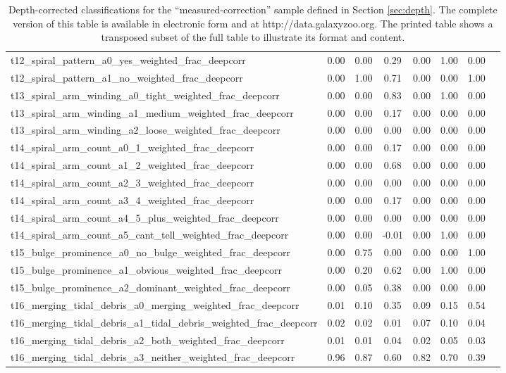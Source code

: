 \begin{table*}
{\begin{tabular}{@{}lccccccc}
t12\_spiral\_pattern\_a0\_yes\_weighted\_frac\_deepcorr & 0.00 & 0.00 & 0.29 & 0.00 & 1.00 & 0.00 & \\
t12\_spiral\_pattern\_a1\_no\_weighted\_frac\_deepcorr & 0.00 & 1.00 & 0.71 & 0.00 & 0.00 & 1.00 & \\
t13\_spiral\_arm\_winding\_a0\_tight\_weighted\_frac\_deepcorr & 0.00 & 0.00 & 0.83 & 0.00 & 1.00 & 0.00 & \\
t13\_spiral\_arm\_winding\_a1\_medium\_weighted\_frac\_deepcorr & 0.00 & 0.00 & 0.17 & 0.00 & 0.00 & 0.00 & \\
t13\_spiral\_arm\_winding\_a2\_loose\_weighted\_frac\_deepcorr & 0.00 & 0.00 & 0.00 & 0.00 & 0.00 & 0.00 & \\
t14\_spiral\_arm\_count\_a0\_1\_weighted\_frac\_deepcorr & 0.00 & 0.00 & 0.17 & 0.00 & 0.00 & 0.00 & \\
t14\_spiral\_arm\_count\_a1\_2\_weighted\_frac\_deepcorr & 0.00 & 0.00 & 0.68 & 0.00 & 0.00 & 0.00 & \\
t14\_spiral\_arm\_count\_a2\_3\_weighted\_frac\_deepcorr & 0.00 & 0.00 & 0.00 & 0.00 & 0.00 & 0.00 & \\
t14\_spiral\_arm\_count\_a3\_4\_weighted\_frac\_deepcorr & 0.00 & 0.00 & 0.17 & 0.00 & 0.00 & 0.00 & \\
t14\_spiral\_arm\_count\_a4\_5\_plus\_weighted\_frac\_deepcorr & 0.00 & 0.00 & 0.00 & 0.00 & 0.00 & 0.00 & \\
t14\_spiral\_arm\_count\_a5\_cant\_tell\_weighted\_frac\_deepcorr & 0.00 & 0.00 & -0.01 & 0.00 & 1.00 & 0.00 & \\
t15\_bulge\_prominence\_a0\_no\_bulge\_weighted\_frac\_deepcorr & 0.00 & 0.75 & 0.00 & 0.00 & 0.00 & 1.00 & \\
t15\_bulge\_prominence\_a1\_obvious\_weighted\_frac\_deepcorr & 0.00 & 0.20 & 0.62 & 0.00 & 1.00 & 0.00 & \\
t15\_bulge\_prominence\_a2\_dominant\_weighted\_frac\_deepcorr & 0.00 & 0.05 & 0.38 & 0.00 & 0.00 & 0.00 & \\
t16\_merging\_tidal\_debris\_a0\_merging\_weighted\_frac\_deepcorr & 0.01 & 0.10 & 0.35 & 0.09 & 0.15 & 0.54 & \\
t16\_merging\_tidal\_debris\_a1\_tidal\_debris\_weighted\_frac\_deepcorr & 0.02 & 0.02 & 0.01 & 0.07 & 0.10 & 0.04 & \\
t16\_merging\_tidal\_debris\_a2\_both\_weighted\_frac\_deepcorr & 0.01 & 0.01 & 0.04 & 0.02 & 0.05 & 0.03 & \\
t16\_merging\_tidal\_debris\_a3\_neither\_weighted\_frac\_deepcorr & 0.96 & 0.87 & 0.60 & 0.82 & 0.70 & 0.39 & \\
\hline
\end{tabular}}
\caption{Depth-corrected classifications for the ``measured-correction'' sample defined in Section \ref{sec:depth}. The complete version of this table is available in electronic form and at http://data.galaxyzoo.org. The printed table shows a transposed subset of the full table to illustrate its format and content.}
\label{table:data-depthcorr}
\end{table*}

